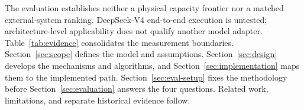 The evaluation establishes neither a physical capacity frontier nor a matched
external-system ranking. DeepSeek-V4 end-to-end execution is untested;
architecture-level applicability does not qualify another model adapter.
Table~\ref{tab:evidence} consolidates the measurement boundaries.
Section~\ref{sec:scope} defines the model and assumptions.
Section~\ref{sec:design} develops the mechanisms and algorithms, and
Section~\ref{sec:implementation} maps them to the implemented path.
Section~\ref{sec:eval-setup} fixes the methodology before
Section~\ref{sec:evaluation} answers the four questions. Related work,
limitations, and separate historical evidence follow.

